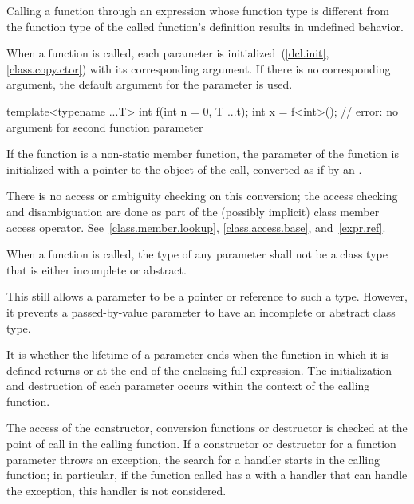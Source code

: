 \pnum
Calling a function through an
expression whose function type is different
from the function type of the called function's
definition results in undefined behavior.

\pnum
{}%
%
%
When a function is called, each parameter is
initialized~(\ref{dcl.init}, \ref{class.copy.ctor}) with
its corresponding argument.
If there is no corresponding argument,
the default argument for the parameter is used.
\begin{example}
\begin{codeblock}
template<typename ...T> int f(int n = 0, T ...t);
int x = f<int>();               // error: no argument for second function parameter
\end{codeblock}
\end{example}
If the function is a non-static member
function, the  parameter of the function
is initialized with a pointer to the object of the call, converted
as if by an .
\begin{note}
There is no access or ambiguity checking on this conversion; the access
checking and disambiguation are done as part of the (possibly implicit)
class member access operator.
See~\ref{class.member.lookup}, \ref{class.access.base},
and~\ref{expr.ref}.
\end{note}
When a function is called, the type of any parameter
shall not be a class type that is either incomplete or abstract.
\begin{note}
This still allows a parameter to be a pointer or reference to such
a type. However, it prevents a passed-by-value parameter
to have an incomplete or abstract class type.
\end{note}
It is  whether the
lifetime of a parameter ends when the function in which it is defined
returns or at the end of the enclosing full-expression.
The initialization and destruction of each parameter occurs
within the context of the calling function.
\begin{example}
The access of the constructor, conversion functions or destructor is
checked at the point of call in the calling function. If a constructor
or destructor for a function parameter throws an exception, the search
for a handler starts in the calling function; in
particular, if the function called has a 
with a handler that can handle the exception,
this handler is not considered.
\end{example}

